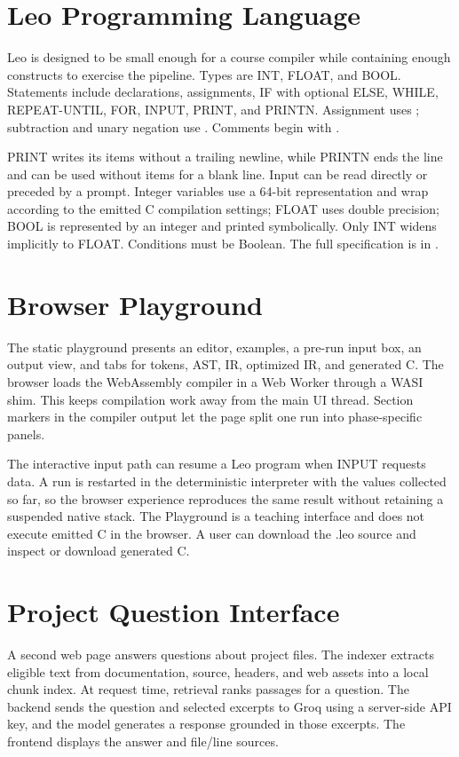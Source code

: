 \documentclass[12pt,a4paper,oneside]{report}
\newcommand{\code}[1]{\texttt{\detokenize{#1}}}
\begin{document}
\section{Leo Programming Language}
Leo is designed to be small enough for a course compiler while containing enough constructs to exercise the pipeline. Types are INT, FLOAT, and BOOL. Statements include declarations, assignments, IF with optional ELSE, WHILE, REPEAT-UNTIL, FOR, INPUT, PRINT, and PRINTN. Assignment uses \code{<-}; subtraction and unary negation use \code{~}. Comments begin with \code{#}.

PRINT writes its items without a trailing newline, while PRINTN ends the line and can be used without items for a blank line. Input can be read directly or preceded by a prompt. Integer variables use a 64-bit representation and wrap according to the emitted C compilation settings; FLOAT uses double precision; BOOL is represented by an integer and printed symbolically. Only INT widens implicitly to FLOAT. Conditions must be Boolean. The full specification is in \code{language/language_spec.md}.

\section{Browser Playground}
The static playground presents an editor, examples, a pre-run input box, an output view, and tabs for tokens, AST, IR, optimized IR, and generated C. The browser loads the WebAssembly compiler in a Web Worker through a WASI shim. This keeps compilation work away from the main UI thread. Section markers in the compiler output let the page split one run into phase-specific panels.

The interactive input path can resume a Leo program when INPUT requests data. A run is restarted in the deterministic interpreter with the values collected so far, so the browser experience reproduces the same result without retaining a suspended native stack. The Playground is a teaching interface and does not execute emitted C in the browser. A user can download the .leo source and inspect or download generated C.

\section{Project Question Interface}
A second web page answers questions about project files. The indexer extracts eligible text from documentation, source, headers, and web assets into a local chunk index. At request time, retrieval ranks passages for a question. The backend sends the question and selected excerpts to Groq using a server-side API key, and the model generates a response grounded in those excerpts. The frontend displays the answer and file/line sources.
\end{document}
